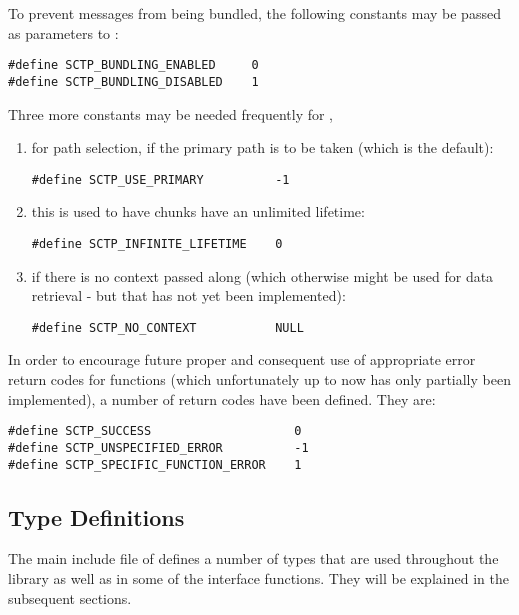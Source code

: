 \documentclass[10pt]{article}
\newcommand{\n}{\normalsize}
\begin{document}
To prevent messages from being bundled, the following constants may be passed
as parameters to   :
\footnotesize
\begin{verbatim}
#define SCTP_BUNDLING_ENABLED     0
#define SCTP_BUNDLING_DISABLED    1
\end{verbatim}\n
\noindent
Three more constants may be needed frequently for ,
\begin{enumerate}
\item for path selection, if the primary path is to be taken
(which is the default):
\footnotesize
\begin{verbatim}
#define SCTP_USE_PRIMARY          -1
\end{verbatim}\n
\item this is used to have chunks have an unlimited lifetime:
\footnotesize
\begin{verbatim}
#define SCTP_INFINITE_LIFETIME    0
\end{verbatim}\n
\item if there is no context passed along (which otherwise might be used for
data retrieval - but that has not yet been implemented):
\footnotesize
\begin{verbatim}
#define SCTP_NO_CONTEXT           NULL
\end{verbatim}\n
\end{enumerate}
\noindent
In order to encourage future proper and consequent use of appropriate error
return codes for functions (which unfortunately up to now has only partially been
implemented), a number of return codes have been defined. They are:
\footnotesize
\begin{verbatim}
#define SCTP_SUCCESS                    0
#define SCTP_UNSPECIFIED_ERROR          -1
#define SCTP_SPECIFIC_FUNCTION_ERROR    1
\end{verbatim}\n

\subsection{Type Definitions}
The main include file of  defines a number of types that
are used throughout the library as well as in some of the interface functions.
They will be explained in the subsequent sections.
\end{document}
